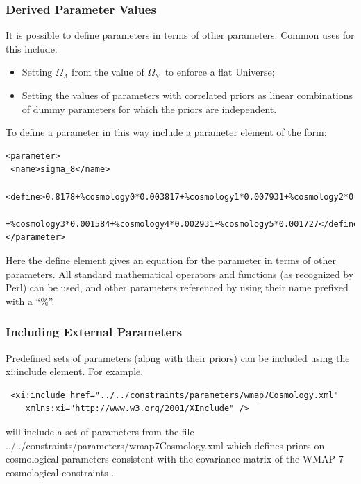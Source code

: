 \subsubsection{Derived Parameter Values}

It is possible to define parameters in terms of other parameters. Common uses for this include:
\begin{itemize}
 \item Setting $\Omega_\Lambda$ from the value of $\Omega_{\mathrm M}$ to enforce a flat Universe;
 \item Setting the values of parameters with correlated priors as linear combinations of dummy parameters for which the priors are independent.
\end{itemize}
To define a parameter in this way include a {\normalfont \ttfamily parameter} element of the form:
\begin{verbatim}
<parameter>
 <name>sigma_8</name>
 <define>0.8178+%cosmology0*0.003817+%cosmology1*0.007931+%cosmology2*0.01002
    +%cosmology3*0.001584+%cosmology4*0.002931+%cosmology5*0.001727</define>
</parameter>
\end{verbatim}
Here the {\normalfont \ttfamily define} element gives an equation for the parameter in terms of other parameters. All standard mathematical operators and functions (as recognized by Perl) can be used, and other parameters referenced by using their name prefixed with a ``\%''.

\subsubsection{Including External Parameters}

Predefined sets of parameters (along with their priors) can be included using the {\normalfont \ttfamily xi:include} element. For example,
\begin{verbatim}
 <xi:include href="../../constraints/parameters/wmap7Cosmology.xml"
    xmlns:xi="http://www.w3.org/2001/XInclude" />
\end{verbatim}
will include a set of parameters from the file {\normalfont \ttfamily ../../constraints/parameters/wmap7Cosmology.xml} which defines priors on cosmological parameters consistent with the covariance matrix of the WMAP-7 cosmological constraints \citep{komatsu_seven-year_2010}.
